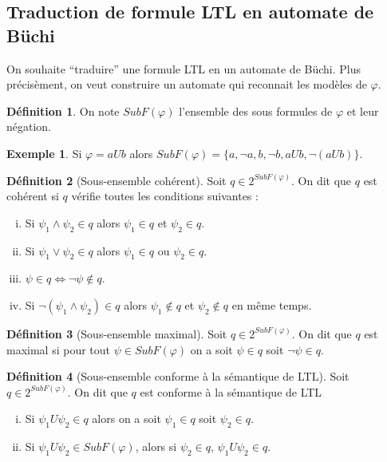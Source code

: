 \documentclass[12pt,a4paper]{article}
\theoremstyle{plain}
\theoremstyle{definition}
\newtheorem{defi}{Définition}
\newtheorem{ex}{Exemple}
\begin{document}
\subsection{Traduction de formule LTL en automate de Büchi}
On souhaite ``traduire'' une formule LTL en un automate de Büchi. Plus précisèment, on veut construire un automate qui reconnait les modèles de $\varphi$.

\begin{defi}
  On note $SubF(\varphi)$ l'ensemble des sous formules de $\varphi$ et leur négation.  
\end{defi}

\begin{ex}
  Si $\varphi = a U b$ alors $SubF(\varphi) = \{ a, \lnot a, b, \lnot b, a U b, \lnot(a U b)\}$.
\end{ex}

\begin{defi}[Sous-ensemble cohérent]
  Soit $q \in 2^{SubF(\varphi)}$. On dit que $q$ est cohérent si $q$ vérifie toutes les conditions suivantes :
  \begin{enumerate}[(i)]
  \item Si $\psi_1 \land \psi_2 \in q$ alors $\psi_1 \in q$ et $\psi_2 \in q$.
  \item Si $\psi_1 \lor \psi_2 \in q$ alors $\psi_1 \in q$ ou $\psi_2 \in q$.
  \item $\psi \in q \iff \lnot \psi \not\in q$.
  \item Si $\lnot (\psi_1 \land \psi_2) \in q$ alors $\psi_1 \not \in q$ et $\psi_2 \not \in q$ en même temps.
  \end{enumerate}
\end{defi}

\begin{defi}[Sous-ensemble maximal]
  Soit $q \in 2^{SubF(\varphi)}$. On dit que $q$ est maximal si pour tout $\psi \in SubF(\varphi)$ on a soit $\psi \in q$ soit $\lnot \psi \in q$.  
\end{defi}

\begin{defi}[Sous-ensemble conforme à la sémantique de LTL]
  Soit $q \in 2^{SubF(\varphi)}$. On dit que $q$ est conforme à la sémantique de LTL
  \begin{enumerate}[(i)]
  \item Si $\psi_1 U \psi_2 \in q$ alors on a soit $\psi_1 \in q$ soit $\psi_2 \in q$.
  \item Si $\psi_1 U \psi_2 \in SubF(\varphi)$, alors si $\psi_2 \in q$, $\psi_1 U \psi_2 \in q$.
  \end{enumerate}
\end{defi}
\end{document}
